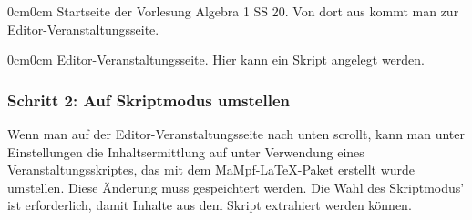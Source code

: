 \documentclass[parskip=off,index=totocnumbered]{scrartcl}
\newenvironment{rückkeinstück}
	{\begin{adjustwidth}{0cm}{0cm}\footnotesize \singlespace \centering} 
	{\end{adjustwidth} \onehalfspacing}
\begin{document}
\noindent \begin{minipage}{\textwidth}
    \begin{rückkeinstück}
        Startseite der Vorlesung Algebra 1 SS 20. Von dort aus kommt man zur Editor-Veranstaltungsseite.
        \vspace{0.4cm}
    \end{rückkeinstück}
\end{minipage}

\noindent \begin{minipage}{\textwidth}
     \begin{rückkeinstück}
        Editor-Veranstaltungsseite. Hier kann ein Skript angelegt werden.
        \vspace{0.6cm}
    \end{rückkeinstück}
\end{minipage}


\subsubsection*{Schritt 2: Auf Skriptmodus umstellen}
Wenn man auf der Editor-Veranstaltungsseite nach unten scrollt, kann man unter \textsf{Einstellungen} die \textsf{Inhaltsermittlung} auf \textsf{unter Verwendung eines Veranstaltungsskriptes, das mit dem MaMpf-\LaTeX-Paket erstellt wurde} umstellen. Diese Änderung muss gespeichtert werden. Die Wahl des Skriptmodus' ist erforderlich, damit Inhalte aus dem Skript extrahiert werden können.
\vspace{0.6cm}
\end{document}
